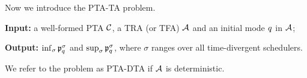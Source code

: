 

Now we introduce the {\sc PTA-TA} problem.

\begin{compactitem}
\item {\bf Input:} a well-formed PTA $\mathcal{C}$, a TRA (or TFA) $\mathcal{A}$ and an initial mode $q$ in $\mathcal{A}$;
\item {\bf Output:} $\inf_\sigma \mathfrak{p}_{q}^{\sigma}$ and $\sup_\sigma  \mathfrak{p}_{q}^{\sigma}$, where $\sigma$ ranges over all time-divergent schedulers.
\end{compactitem}

We refer to the problem as {\sc PTA-DTA} if $\mathcal{A}$ is deterministic.


